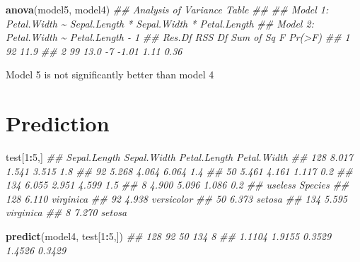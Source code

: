 \documentclass[
  notitlepage]{book}
\newenvironment{Shaded}{\begin{snugshade}}{\end{snugshade}}
\newcommand{\CommentTok}[1]{\textcolor[rgb]{0.56,0.35,0.01}{\textit{#1}}}
\newcommand{\DecValTok}[1]{\textcolor[rgb]{0.00,0.00,0.81}{#1}}
\newcommand{\KeywordTok}[1]{\textcolor[rgb]{0.13,0.29,0.53}{\textbf{#1}}}
\newcommand{\NormalTok}[1]{#1}
\newcommand{\OperatorTok}[1]{\textcolor[rgb]{0.81,0.36,0.00}{\textbf{#1}}}
\begin{document}
\begin{Shaded}
\begin{Highlighting}[]
\KeywordTok{anova}\NormalTok{(model5, model4)}
\CommentTok{\#\# Analysis of Variance Table}
\CommentTok{\#\# }
\CommentTok{\#\# Model 1: Petal.Width \textasciitilde{} Sepal.Length * Sepal.Width * Petal.Length}
\CommentTok{\#\# Model 2: Petal.Width \textasciitilde{} Petal.Length {-} 1}
\CommentTok{\#\#   Res.Df  RSS Df Sum of Sq    F Pr(\textgreater{}F)}
\CommentTok{\#\# 1     92 11.9                         }
\CommentTok{\#\# 2     99 13.0 {-}7     {-}1.01 1.11   0.36}
\end{Highlighting}
\end{Shaded}

Model 5 is not significantly better than model 4

\hypertarget{prediction}{%
\section{Prediction}\label{prediction}}

\begin{Shaded}
\begin{Highlighting}[]
\NormalTok{test[}\DecValTok{1}\OperatorTok{:}\DecValTok{5}\NormalTok{,]}
\CommentTok{\#\#     Sepal.Length Sepal.Width Petal.Length Petal.Width}
\CommentTok{\#\# 128        8.017       1.541        3.515         1.8}
\CommentTok{\#\# 92         5.268       4.064        6.064         1.4}
\CommentTok{\#\# 50         5.461       4.161        1.117         0.2}
\CommentTok{\#\# 134        6.055       2.951        4.599         1.5}
\CommentTok{\#\# 8          4.900       5.096        1.086         0.2}
\CommentTok{\#\#     useless    Species}
\CommentTok{\#\# 128   6.110  virginica}
\CommentTok{\#\# 92    4.938 versicolor}
\CommentTok{\#\# 50    6.373     setosa}
\CommentTok{\#\# 134   5.595  virginica}
\CommentTok{\#\# 8     7.270     setosa}
\end{Highlighting}
\end{Shaded}

\begin{Shaded}
\end{Shaded}

\begin{Shaded}
\begin{Highlighting}[]
\KeywordTok{predict}\NormalTok{(model4, test[}\DecValTok{1}\OperatorTok{:}\DecValTok{5}\NormalTok{,])}
\CommentTok{\#\#    128     92     50    134      8 }
\CommentTok{\#\# 1.1104 1.9155 0.3529 1.4526 0.3429}
\end{Highlighting}
\end{Shaded}
\end{document}
